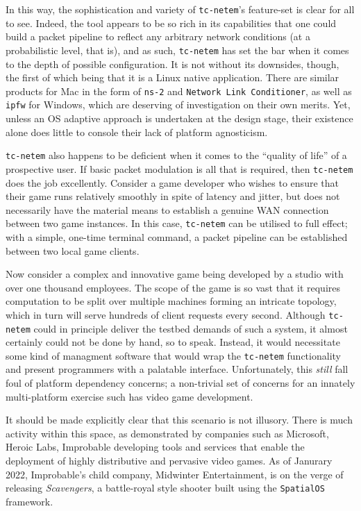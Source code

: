 In this way, the sophistication and variety of \texttt{tc-netem}'s feature-set is clear for all to see. Indeed, the
tool appears to be so rich in its capabilities that one could build a packet pipeline to reflect any arbitrary
network conditions (at a probabilistic level, that is), and as such, \texttt{tc-netem} has set the bar when it comes to
the depth of possible configuration. It is not without its downsides, though, the first of which being that it is a
Linux native application. There are similar products for Mac in the form of \texttt{ns-2}\cite{ns_2_man, ns_2_wiki}
and \texttt{Network Link Conditioner}\cite{nlc}, as well as \texttt{ipfw}\cite{ipfw,ipfw_man} for Windows, which are
deserving of investigation on their own merits. Yet, unless an OS adaptive approach is undertaken at the design
stage, their existence alone does little to console their lack of platform agnosticism.

\texttt{tc-netem} also happens to be deficient when it comes to the ``quality of life'' of a prospective user. If basic
packet modulation is all that is required, then \texttt{tc-netem} does the job excellently. Consider a game developer
who wishes to ensure that their game runs relatively smoothly in spite of latency and jitter, but does not necessarily
have the material means to establish a genuine WAN\cite{wan_cisco} connection between two game instances. In this
case, \texttt{tc-netem} can be utilised to full effect; with a simple, one-time terminal command, a packet pipeline
can be established between two local game clients.

Now consider a complex and innovative game being developed by a
studio with over one thousand employees. The scope of the game is so vast that it requires computation to be split over
multiple machines forming an intricate topology, which in turn will serve hundreds of client requests every second.
Although \texttt{tc-netem} could in principle deliver the testbed demands of such a system, it almost certainly
could not be done by hand, so to speak. Instead, it would necessitate some kind of managment software that would wrap
the \texttt{tc-netem} functionality and present programmers with a palatable interface. Unfortunately, this \emph{still}
fall foul of platform dependency concerns; a non-trivial set of concerns for an innately multi-platform exercise such
has video game development.

It should be made explicitly clear that this scenario is not illusory. There is much activity within this
space, as demonstrated by companies such as Microsoft, Heroic Labs, Improbable developing tools and services that
enable the deployment of highly distributive and pervasive video games\cite{microsoft_playfab, heroic_labs_nakama,
    improbable_spatialos, improbable_spatialos_unreal_gdk_github}. As of Janurary 2022, Improbable's child company,
Midwinter Entertainment, is on the verge of releasing \emph{Scavengers}\cite{improbable_spatialos_scavengers}, a
battle-royal style shooter built using the \texttt{SpatialOS} framework\cite{improbable_spatialos,
    improbable_spatialos_unreal_gdk_github}.

